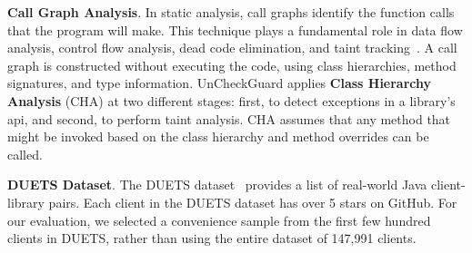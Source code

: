 \textbf{Call Graph Analysis}. In static analysis, call graphs identify the function calls that the program will make. This technique plays a fundamental role in data flow analysis, control flow analysis, dead code elimination, and taint tracking~\cite{Keshani2024}. A call graph is constructed without executing the code, using class hierarchies, method signatures, and type information. UnCheckGuard applies \textbf{Class Hierarchy Analysis} (CHA) at two different stages: first, to detect exceptions in a library’s \gls{api}, and second, to perform taint analysis. CHA assumes that any method that might be invoked based on the class hierarchy and method overrides can be called.

\textbf{DUETS Dataset}. The DUETS dataset~\cite{durieux21:_duets} provides a list of real-world Java client-library pairs. Each client in the DUETS dataset has over 5 stars on GitHub. For our evaluation, we selected a convenience sample from the first few hundred clients in DUETS, rather than using the entire dataset of 147,991 clients.